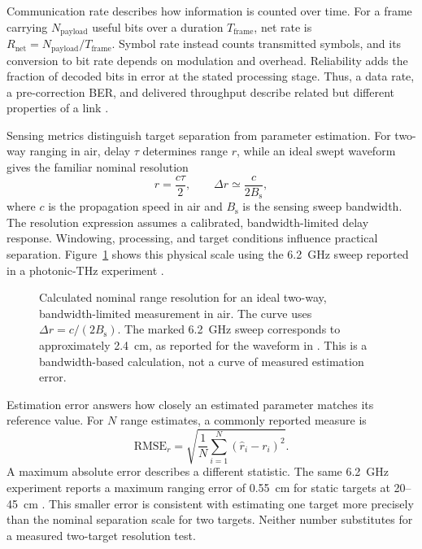 Communication rate describes how information is counted over time.
For a frame carrying $N_{\mathrm{payload}}$ useful bits over a duration
$T_{\mathrm{frame}}$, net rate is
$R_{\mathrm{net}}=N_{\mathrm{payload}}/T_{\mathrm{frame}}$.
Symbol rate instead counts transmitted symbols, and its conversion to bit
rate depends on modulation and overhead. Reliability adds the fraction of
decoded bits in error at the stated processing stage. Thus, a data rate,
a pre-correction BER, and delivered throughput describe related but different
properties of a link
\cite{OISAC_SCR01054,OISAC_SCR01180}.

Sensing metrics distinguish target separation from parameter estimation.
For two-way ranging in air, delay $\tau$ determines range $r$, while an
ideal swept waveform gives the familiar nominal resolution
\begin{equation}
r=\frac{c\tau}{2},
\qquad
\Delta r \simeq \frac{c}{2B_{\mathrm{s}}},
\label{eq:range_and_resolution}
\end{equation}
where $c$ is the propagation speed in air and $B_{\mathrm{s}}$ is the sensing
sweep bandwidth. The resolution
expression assumes a calibrated, bandwidth-limited delay response.
Windowing, processing, and target conditions influence practical separation.
Figure~\ref{fig:bandwidth_resolution} shows this physical scale using the
6.2~GHz sweep reported in a photonic-THz experiment
\cite{OISAC_SCR00083}.

\begin{figure}[!t]
\centering

\caption{Calculated nominal range resolution for an ideal two-way,
bandwidth-limited measurement in air. The curve uses
$\Delta r=c/(2B_{\mathrm{s}})$. The marked 6.2~GHz sweep corresponds to
approximately 2.4~cm, as reported for the waveform in
\cite{OISAC_SCR00083}. This is a bandwidth-based calculation, not a curve of
measured estimation error.}
\label{fig:bandwidth_resolution}
\end{figure}

Estimation error answers how closely an estimated parameter matches its
reference value. For $N$ range estimates, a commonly reported measure is
\begin{equation}
\mathrm{RMSE}_{r}=
\sqrt{\frac{1}{N}\sum_{i=1}^{N}(\hat r_i-r_i)^2}.
\label{eq:ranging_rmse}
\end{equation}
A maximum absolute error describes a different statistic. The same
6.2~GHz experiment reports a maximum ranging error of 0.55~cm for static
targets at 20--45~cm \cite{OISAC_SCR00083}. This smaller error is consistent
with estimating one target more precisely than the nominal separation scale
for two targets. Neither number substitutes for a measured two-target
resolution test.

